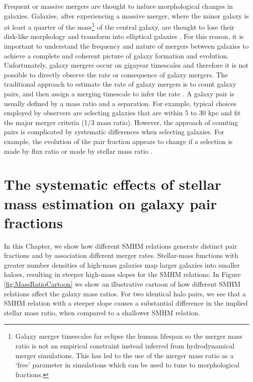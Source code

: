 Frequent or massive mergers are thought to induce morphological changes in galaxies. 
Galaxies, after experiencing a massive merger, where the minor galaxy is at least a quarter of the mass\footnote{Galaxy merger timescales far eclipse the human lifespan so the merger mass ratio is not an empirical constraint instead inferred from hydrodynamical merger simulations. This has led to the use of the merger mass ratio as a `free' parameter in simulations which can be used to tune to morphological fractions.} of the central galaxy, are thought to lose their disk-like morphology and transform into elliptical galaxies \citep{Negroponte1983SimulationsGalaxies, DeLucia2006TheGalaxies}. 
For this reason, it is important to understand the frequency and nature of mergers between galaxies to achieve a complete and coherent picture of galaxy formation and evolution. 
Unfortunately, galaxy mergers occur on gigayear timescales and therefore it is not possible to directly observe the rate or consequence of galaxy mergers. 
The traditional approach to estimate the rate of galaxy mergers is to count galaxy pairs, and then assign a merging timescale to infer the rate \citep{Conselice20033,Conselice2008TheField,Mundy2017A3.5,Duncan2019ObservationalFields}.
A galaxy pair is usually defined by a mass ratio and a separation. For example, typical choices employed by observers are selecting galaxies that are within 5 to 30 kpc and fit the major merger criteria (1/3 mass ratio).
However, the approach of counting pairs is complicated by systematic differences when selecting galaxies. For example, the evolution of the pair fraction appears to change if a selection is made by flux ratio or made by stellar mass ratio \citep{Man2016RESOLVING03}.

\section{The systematic effects of stellar mass estimation on galaxy pair fractions}


In this Chapter, we show how different SMHM relations generate distinct pair fractions and by association different merger rates. 
Stellar-mass functions with greater number densities of high-mass galaxies map larger galaxies into smaller haloes, resulting in steeper high-mass slopes for the SMHM relations.
In Figure \ref{fig:MassRatioCartoon} we show an illustrative cartoon of how different SMHM relations affect the galaxy mass ratios. 
For two identical halo pairs, we see that a SMHM relation with a steeper slope causes a substantial difference in the implied stellar mass ratio, when compared to a shallower SMHM relation. 

